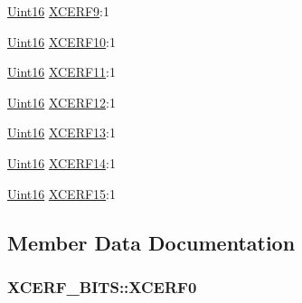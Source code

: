 \begin{DoxyCompactItemize}
\item 
\hyperlink{_d_s_p2833x___device_8h_a59a9f6be4562c327cbfb4f7e8e18f08b}{Uint16} \hyperlink{struct_x_c_e_r_f___b_i_t_s_aa80b2676d6f652a460e673f9fe0fa083}{X\+C\+E\+R\+F9}\+:1
\item 
\hyperlink{_d_s_p2833x___device_8h_a59a9f6be4562c327cbfb4f7e8e18f08b}{Uint16} \hyperlink{struct_x_c_e_r_f___b_i_t_s_a6c52636a6795496c61c94a7f506335dd}{X\+C\+E\+R\+F10}\+:1
\item 
\hyperlink{_d_s_p2833x___device_8h_a59a9f6be4562c327cbfb4f7e8e18f08b}{Uint16} \hyperlink{struct_x_c_e_r_f___b_i_t_s_a210e494ec2d30bab95209dfb34a4b8ea}{X\+C\+E\+R\+F11}\+:1
\item 
\hyperlink{_d_s_p2833x___device_8h_a59a9f6be4562c327cbfb4f7e8e18f08b}{Uint16} \hyperlink{struct_x_c_e_r_f___b_i_t_s_aa9411e04c7d7cf93f61dd9dbd829084b}{X\+C\+E\+R\+F12}\+:1
\item 
\hyperlink{_d_s_p2833x___device_8h_a59a9f6be4562c327cbfb4f7e8e18f08b}{Uint16} \hyperlink{struct_x_c_e_r_f___b_i_t_s_a662e059f7f471695ca65278cdc50905b}{X\+C\+E\+R\+F13}\+:1
\item 
\hyperlink{_d_s_p2833x___device_8h_a59a9f6be4562c327cbfb4f7e8e18f08b}{Uint16} \hyperlink{struct_x_c_e_r_f___b_i_t_s_a4f573ab56a9e89d79fabe131edd856db}{X\+C\+E\+R\+F14}\+:1
\item 
\hyperlink{_d_s_p2833x___device_8h_a59a9f6be4562c327cbfb4f7e8e18f08b}{Uint16} \hyperlink{struct_x_c_e_r_f___b_i_t_s_ad50b600d7b88d7ecf4700fd525df0080}{X\+C\+E\+R\+F15}\+:1
\end{DoxyCompactItemize}


\subsection{Member Data Documentation}
\hypertarget{struct_x_c_e_r_f___b_i_t_s_a5e8d8d25d7e7e35e2275f8da462c0863}{}
\subsubsection[{X\+C\+E\+R\+F0}]{ X\+C\+E\+R\+F\+\_\+\+B\+I\+T\+S\+::\+X\+C\+E\+R\+F0}\label{struct_x_c_e_r_f___b_i_t_s_a5e8d8d25d7e7e35e2275f8da462c0863}
\hypertarget{struct_x_c_e_r_f___b_i_t_s_a23015ebe1a6caee53c236a5898e028fc}{}
